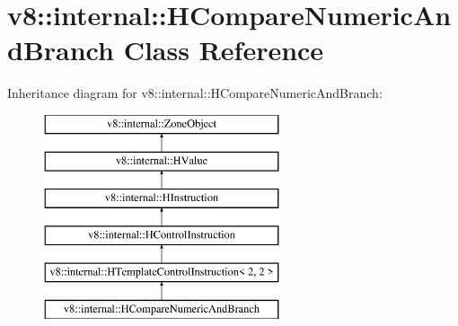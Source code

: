 \hypertarget{classv8_1_1internal_1_1_h_compare_numeric_and_branch}{}\section{v8\+:\+:internal\+:\+:H\+Compare\+Numeric\+And\+Branch Class Reference}
\label{classv8_1_1internal_1_1_h_compare_numeric_and_branch}
Inheritance diagram for v8\+:\+:internal\+:\+:H\+Compare\+Numeric\+And\+Branch\+:\begin{figure}[H]
\begin{center}
\leavevmode
\includegraphics[height=6.000000cm]{classv8_1_1internal_1_1_h_compare_numeric_and_branch}
\end{center}
\end{figure}
